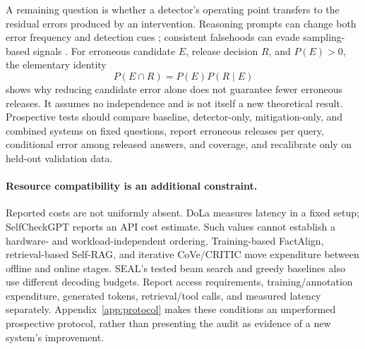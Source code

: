 A remaining question is whether a detector's operating point transfers to the residual errors produced by an intervention. Reasoning prompts can change both error frequency and detection cues \citep{cheng-etal-2025-chain}; consistent falsehoods can evade sampling-based signals \citep{extsemanticentropy2024,cheang-etal-2026-llms}. For erroneous candidate $E$, release decision $R$, and $P(E)>0$, the elementary identity
\begin{equation}\label{eq:release}
P(E\cap R)=P(E)P(R\mid E)
\end{equation}
shows why reducing candidate error alone does not guarantee fewer erroneous releases. It assumes no independence and is not itself a new theoretical result. Prospective tests should compare baseline, detector-only, mitigation-only, and combined systems on fixed questions, report erroneous releases per query, conditional error among released answers, and coverage, and recalibrate only on held-out validation data.

\paragraph{Resource compatibility is an additional constraint.}
Reported costs are not uniformly absent. DoLa measures latency in a fixed setup; SelfCheckGPT reports an API cost estimate. Such values cannot establish a hardware- and workload-independent ordering. Training-based FactAlign, retrieval-based Self-RAG, and iterative CoVe/CRITIC move expenditure between offline and online stages. SEAL's tested beam search and greedy baselines also use different decoding budgets. Report access requirements, training/annotation expenditure, generated tokens, retrieval/tool calls, and measured latency separately. Appendix~\ref{app:protocol} makes these conditions an unperformed prospective protocol, rather than presenting the audit as evidence of a new system's improvement.
